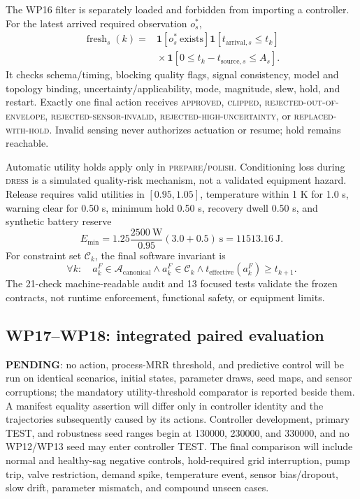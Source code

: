 \documentclass[10pt,twocolumn]{article}
\newcommand{\pending}{\textcolor{orange!70!black}{\textbf{PENDING}}}
\begin{document}
The WP16 filter is separately loaded and forbidden from importing a
controller. For the latest arrived required observation $o_s^*$,
\begin{equation}
\begin{aligned}
\operatorname{fresh}_s(k)={}&
\mathbf 1[o_s^*\ \mathrm{exists}]
\mathbf 1[t_{\mathrm{arrival},s}\le t_k]\\
&{}\times\mathbf 1[0\le t_k-t_{\mathrm{source},s}\le A_s].
\end{aligned}
\label{eq:safety-freshness}
\end{equation}
It checks schema/timing, blocking quality flags, signal consistency, model and
topology binding, uncertainty/applicability, mode, magnitude, slew, hold, and
restart. Exactly one final action receives \textsc{approved},
\textsc{clipped}, \textsc{rejected-out-of-envelope},
\textsc{rejected-sensor-invalid}, \textsc{rejected-high-uncertainty}, or
\textsc{replaced-with-hold}. Invalid sensing never authorizes actuation or
resume; hold remains reachable.

Automatic utility holds apply only in \textsc{prepare}/\textsc{polish}.
Conditioning loss during \textsc{dress} is a simulated quality-risk mechanism,
not a validated equipment hazard. Release requires valid utilities in
$[0.95,1.05]$, temperature within 1 K for 1.0 s, warning clear for 0.50 s,
minimum hold 0.50 s, recovery dwell 0.50 s, and synthetic battery reserve
\[
E_{\min}=1.25\frac{2500\ \mathrm{W}}{0.95}(3.0+0.5)\ \mathrm{s}
=11513.16\ \mathrm{J}.
\]
For constraint set $\mathcal C_k$, the final software invariant is
\begin{equation}
\forall k:\quad a_k^F\in\mathcal A_{\mathrm{canonical}}
\land a_k^F\in\mathcal C_k
\land t_{\mathrm{effective}}(a_k^F)\ge t_{k+1}.
\label{eq:final-action}
\end{equation}
The 21-check machine-readable audit and 13 focused tests validate the frozen
contracts, not runtime enforcement, functional safety, or equipment limits.

\subsection{WP17--WP18: integrated paired evaluation}

\pending{}: no action, process-MRR threshold, and predictive control will be
run on identical scenarios, initial states, parameter draws, seed maps, and
sensor corruptions; the mandatory utility-threshold comparator is reported
beside them. A manifest equality assertion will differ only in controller
identity and the trajectories subsequently caused by its actions. Controller
development, primary TEST, and robustness seed ranges begin at 130000, 230000,
and 330000, and no WP12/WP13 seed may enter controller TEST. The final
comparison will include normal and healthy-sag negative controls, hold-required
grid interruption, pump trip, valve restriction, demand spike, temperature
event, sensor bias/dropout, slow drift, parameter mismatch, and compound unseen
cases.
\end{document}
